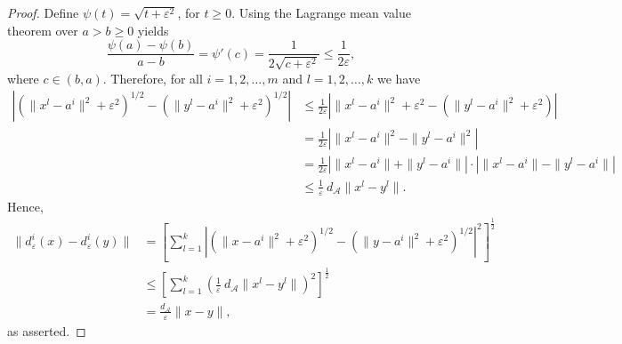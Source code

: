\documentclass[11pt]{article}
\numberwithin{equation}{section}
\def\abs#1{\left\lvert#1\right\rvert}
\begin{document}
\begin{proof}
Define $\psi(t)=\sqrt{t + {\varepsilon}^2}$, for $t \geq 0$. Using the Lagrange mean value theorem over $a > b \geq 0$ yields
\begin{equation*}
	\frac{\psi(a) - \psi(b)}{a - b} = \psi'(c) = \frac{1}{2\sqrt{c + {\varepsilon}^2}} \leq \frac{1}{2\varepsilon},
\end{equation*}
where $c \in (b,a)$.
Therefore, for all $i=1,2, \ldots, m$ and $l=1,2, \ldots, k$ we have
\begin{equation*}
\begin{aligned}
	\abs{\left( \|x^l-a^i\|^2  + {\varepsilon}^2 \right)^{1/2} - \left( \|y^l-a^i\|^2 + {\varepsilon}^2 \right)^{1/2} } 
	&\leq \frac{1}{2\varepsilon} \abs{ \|x^l-a^i\|^2 + {\varepsilon}^2 - \left( \|y^l-a^i\|^2 + {\varepsilon}^2 \right) } \\
	&= \frac{1}{2\varepsilon} \abs{\|x^l-a^i\|^2 - \|y^l-a^i\|^2} \\
	&= \frac{1}{2\varepsilon} \abs{\|x^l-a^i\| + \|y^l-a^i\|} \cdot \abs{\|x^l-a^i\| - \|y^l-a^i\|} \\
	&\leq \frac{1}{\varepsilon} \: d_{\mathcal{A}}\|x^l-y^l\| .
\end{aligned}
\end{equation*}
Hence,
\begin{equation*}
\begin{aligned}
	\|d_{\varepsilon}^i(x) - d_{\varepsilon}^i(y)\| 
	&= \left[ \sum_{l=1}^{k} \abs{\left( \|x-a^i\|^2  + {\varepsilon}^2 \right)^{1/2} - \left( \|y-a^i\|^2 + {\varepsilon}^2 \right)^{1/2} }^2 \right]^\frac{1}{2} \\
	&\leq \left[ \sum_{l=1}^{k} \left( \frac{1}{\varepsilon} \: d_{\mathcal{A}}\|x^l-y^l\| \right)^2 \right]^\frac{1}{2} \\
	&= \frac{ d_{\mathcal{A}}}{\varepsilon}\|x-y\| ,
\end{aligned}
\end{equation*}
as asserted.
\end{proof}
\end{document}
